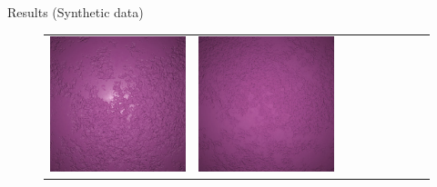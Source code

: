\documentclass[final]{beamer}
\newlength{\twocolwid}
\newlength{\resultwidth}
\begin{document}
\begin{frame}[t]
\begin{columns}[t]
\begin{column}{\twocolwid}
\begin{block}{Results (Synthetic data)}
\begin{figure}[t]
\begin{tabular}{ccrclcccc}
            		\includegraphics[width=\resultwidth]{images/synth/plaster/good3.jpg} &
            		\includegraphics[width=\resultwidth]{images/synth/plaster/bad1.jpg}
            		\\

\end{tabular}
\end{figure}
\end{block}
\end{column}
\end{columns}
\end{frame}
\end{document}
